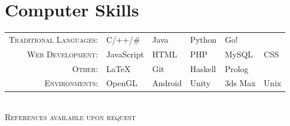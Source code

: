 \documentclass[a4paper,10pt]{article}
\begin{document}
	\section{Computer Skills}
	\def\arraystretch{1.2}%
	\begin{tabu}to \textwidth{r X[c] X[c] X[c] X[c] X[c]}
		\textsc{Traditional Languages:}		&	C/++/\#		&   Java	&	Python	&   Go! &		\\
		\textsc{Web Development:}		    &   JavaScript	&	HTML	&	PHP		&	MySQL    &  CSS	\\
		\textsc{Other:}				        &	LaTeX		&   Git	    &   Haskell &   Prolog   &  	\\
		\textsc{Environments:}		        &	OpenGL		&	Android	&   Unity		&	3ds Max	&	Unix	\\
	\end{tabu}
	\\[0.cm]
	
	\centering\textsc{ References available upon request}
	
\end{document}

